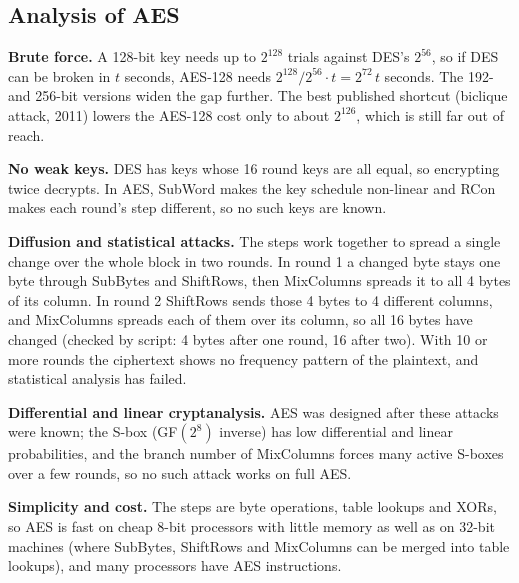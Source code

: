 \subsection{Analysis of AES}
\textbf{Brute force.} A 128-bit key needs up to $2^{128}$ trials against DES's $2^{56}$, so if DES can be broken in $t$ seconds, AES-128 needs $2^{128} / 2^{56} \cdot t = 2^{72}\,t$ seconds. The 192- and 256-bit versions widen the gap further. The best published shortcut (biclique attack, 2011) lowers the AES-128 cost only to about $2^{126}$, which is still far out of reach.

\textbf{No weak keys.} DES has keys whose 16 round keys are all equal, so encrypting twice decrypts. In AES, SubWord makes the key schedule non-linear and RCon makes each round's step different, so no such keys are known.

\textbf{Diffusion and statistical attacks.} The steps work together to spread a single change over the whole block in two rounds. In round 1 a changed byte stays one byte through SubBytes and ShiftRows, then MixColumns spreads it to all 4 bytes of its column. In round 2 ShiftRows sends those 4 bytes to 4 different columns, and MixColumns spreads each of them over its column, so all 16 bytes have changed (checked by script: 4 bytes after one round, 16 after two). With 10 or more rounds the ciphertext shows no frequency pattern of the plaintext, and statistical analysis has failed.

\textbf{Differential and linear cryptanalysis.} AES was designed after these attacks were known; the S-box (GF$(2^8)$ inverse) has low differential and linear probabilities, and the branch number of MixColumns forces many active S-boxes over a few rounds, so no such attack works on full AES.

\textbf{Simplicity and cost.} The steps are byte operations, table lookups and XORs, so AES is fast on cheap 8-bit processors with little memory as well as on 32-bit machines (where SubBytes, ShiftRows and MixColumns can be merged into table lookups), and many processors have AES instructions.

